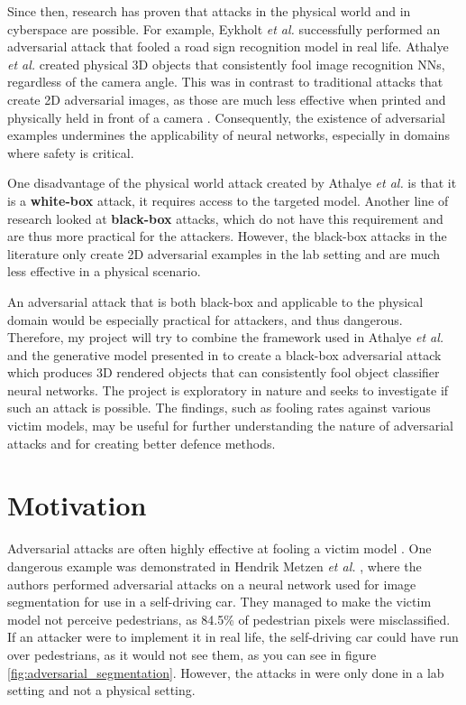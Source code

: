 \documentclass[11pt, a4paper, oneside]{article}
\begin{document}
Since then, research has proven that attacks in the physical world \cite{evtimov_road_signs} and in cyberspace \cite{papernot_cyberspace_attack} are possible. For example, Eykholt \textit{et al.} \cite{evtimov_road_signs} successfully performed an adversarial attack that fooled a road sign recognition model in real life. Athalye \textit{et al.} \cite{athalye} created physical 3D objects that consistently fool image recognition NNs, regardless of the camera angle. This was in contrast to traditional attacks that create 2D adversarial images, as those are much less effective when printed and physically held in front of a camera \cite{lu_physical_experiments}. Consequently, the existence of adversarial examples undermines the applicability of neural networks, especially in domains where safety is critical.

One disadvantage of the physical world attack created by Athalye \textit{et al.} is that it is a \textbf{white-box} attack, it requires access to the targeted model. Another line of research looked at \textbf{black-box} attacks, which do not have this requirement \cite{akhtar} and are thus more practical for the attackers. However, the black-box attacks in the literature only create 2D adversarial examples in the lab setting and are much less effective in a physical scenario.

An adversarial attack that is both black-box and applicable to the physical domain would be especially practical for attackers, and thus dangerous. Therefore, my project will try to combine the framework used in Athalye \textit{et al.} \cite{athalye} and the generative model presented in \cite{zheng_black_box_GAN} to create a black-box adversarial attack which produces 3D rendered objects that can consistently fool object classifier neural networks. The project is exploratory in nature and seeks to investigate if such an attack is possible. The findings, such as fooling rates against various victim models, may be useful for further understanding the nature of adversarial attacks and for creating better defence methods. 

\section{Motivation}
    \label{sec:motivation}

Adversarial attacks are often highly effective at fooling a victim model \cite{akhtar, silva_survey, dong2020benchmarking, robustart, fgsm}. One dangerous example was demonstrated in Hendrik Metzen \textit{et al.} \cite{Metzen_2017_ICCV}, where the authors performed adversarial attacks on a neural network used for image segmentation for use in a self-driving car. They managed to make the victim model not perceive pedestrians, as 84.5\% of pedestrian pixels were misclassified. If an attacker were to implement it in real life, the self-driving car could have run over pedestrians, as it would not see them, as you can see in figure \ref{fig:adversarial_segmentation}. However, the attacks in \cite{Metzen_2017_ICCV} were only done in a lab setting and not a physical setting.
\end{document}
